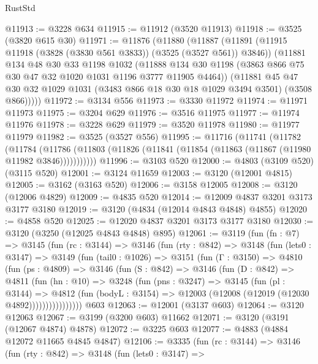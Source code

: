 \begin{lexlean}{RustStd}
\begin{coremodule}
@11913 := @3228 @634
@11915 := @11912 (@3520 @11913)
@11918 := @3525 (@3820 @615 @30)
@11971 := @11876
    (@11880
      (@11887
        (@11891 (@11915 @11918 (@3828 (@3830 @561 @3833)) (@3525 (@3527 @561)) @3846))
        (@11881
          @134
          @48
          @30
          @33
          @1198
          @1032
          (@11888 @134 @30 @1198 (@3863 @866 @75 @30 @47 @32 @1020 @1031 @1196 @3777 @11905 @4464))
          (@11881
            @45
            @47
            @30
            @32
            @1029
            @1031
            (@3483 @866 @18 @30 @18 @1029 @3494 @3501)
            (@3508 @866)))))
@11972 := @3134 @556
@11973 := @3330 @11972
@11974 := @11971 @11973
@11975 := @3204 @629
@11976 := @3516 @11975
@11977 := @11974 @11976
@11978 := @3228 @629
@11979 := @3520 @11978
@11980 := @11977 @11979
@11982 := @3525 (@3527 @556)
@11995 := @11716
    (@11741
      (@11782
        (@11784
          (@11786 (@11803 (@11826 (@11841 (@11854 (@11863 (@11867 (@11980 @11982 @3846)))))))))))
@11996 := @3103 @520
@12000 := @4803 (@3109 @520) (@3115 @520)
@12001 := @3124 @11659
@12003 := @3120 (@12001 @4815)
@12005 := @3162 (@3163 @520)
@12006 := @3158 @12005
@12008 := @3120 (@12006 @4829)
@12009 := @4835 @520
@12014 := @12009 @4837 @3201 @3173 @3177 @3180
@12019 := @3120 (@4834 (@12014 @4843 @4848) @4855)
@12020 := @4858 @520
@12025 := @12020 @4837 @3201 @3173 @3177 @3180
@12030 := @3120 (@3250 (@12025 @4843 @4848) @895)
@12061 := @3119
    (fun (fn : @7) =>
    @3145
      (fun (rc : @3144) =>
      @3146
        (fun (rty : @842) =>
        @3148
          (fun (lets0 : @3147) =>
          @3149
            (fun (tail0 : @1026) =>
            @3151
              (fun (Γ : @3150) =>
              @4810
                (fun (ps : @4809) =>
                @3146
                  (fun (S : @842) =>
                  @3146
                    (fun (D : @842) =>
                    @4811
                      (fun (hn : @10) =>
                      @3248
                        (fun (pns : @3247) =>
                        @3145
                          (fun (pl : @3144) =>
                          @4812
                            (fun (bodyL : @3154) =>
                            @12003 (@12008 (@12019 (@12030 @4892))))))))))))))))
    @603
@12063 := @12001 (@3137 @603)
@12064 := @3120 @12063
@12067 := @3199 (@3200 @603) @11662
@12071 := @3120 (@3191 (@12067 @4874) @4878)
@12072 := @3225 @603
@12077 := @4883 (@4884 @12072 @11665 @4845 @4847)
@12106 := @3335
    (fun (rc : @3144) =>
    @3146
      (fun (rty : @842) =>
      @3148
        (fun (lets0 : @3147) =>

\end{coremodule}
\end{lexlean}
